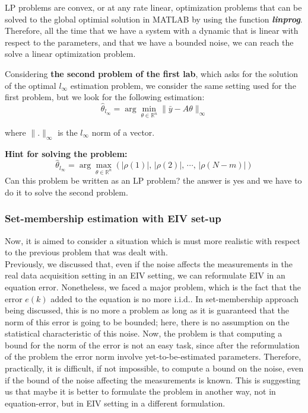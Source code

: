 LP problems are convex, or at any rate linear, optimization problems that can be solved to the global optimial solution in MATLAB by using the function \textit{\textbf{linprog}}. Therefore, all the time that we have a system with a dynamic that is linear with respect to the parameters, and that we have a bounded noise, we can reach the solve a linear optimization problem.
\begin{QandAbox}
Considering \textbf{the second problem of the first lab}, which asks for the solution of the optimal \(l_\infty\) estimation problem, we consider the same setting used for the first problem, but we look for the following estimation:\\
\[
\hat{\theta}_{l_\infty} = \arg \min\limits_{\theta \in \mathbb{R}^n}\|\bar{y} - A\theta\|_\infty
\]

where \(\|.\|_\infty\) is the \(l_\infty\) norm of a vector.

\textbf{Hint for solving the problem:}\\
\[
\hat{\theta}_{l_\infty} = \arg \max\limits_{\theta \in \mathbb{R}^n}(|\rho(1)|,\, |\rho(2)|,\, \cdots,\, |\rho(N-m)|)
\]
Can this problem be written as an LP problem? the answer is yes and we have to do it to solve the second problem.
\end{QandAbox}

\subsubsection{Set-membership estimation with EIV set-up}
Now, it is aimed to consider a situation which is must more realistic with respect to the previous problem that was dealt with.\\
Previously, we discussed that, even if the noise affects the measurements in the real data acquisition setting in an EIV setting, we can reformulate EIV in an equation error. Nonetheless, we faced a major problem, which is the fact that the error $e(k)$ added to the equation is no more i.i.d.. In set-membership approach being discussed, this is no more a problem as long as it is guaranteed that the norm of this error is going to be bounded; here, there is no assumption on the statistical characteristic of this noise. Now, the problem is that computing a bound for the norm of the error is not an easy task, since after the reformulation of the problem the error norm involve yet-to-be-estimated parameters. Therefore, practically, it is difficult, if not impossible, to compute a bound on the noise, even if the bound of the noise affecting the measurements is known. This is suggesting us that maybe it is better to formulate the problem in another way, not in equation-error, but in EIV setting in a different formulation.

